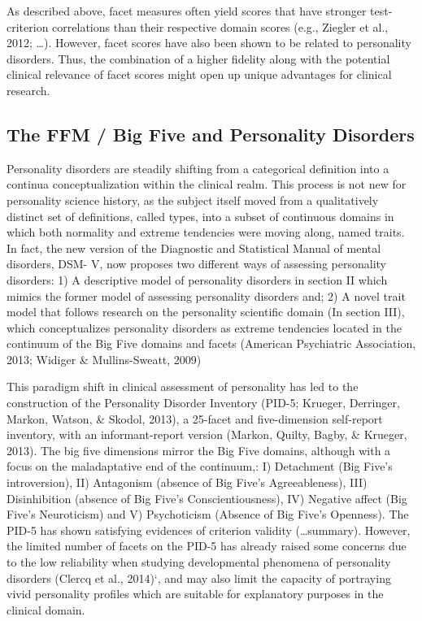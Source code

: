 \documentclass[man]{apa6}
\theoremstyle{definition}
\theoremstyle{definition}
\theoremstyle{definition}
\theoremstyle{remark}
\begin{document}
As described above, facet measures often yield scores that have stronger
test-criterion correlations than their respective domain scores (e.g.,
Ziegler et al., 2012; \ldots{}). However, facet scores have also been
shown to be related to personality disorders. Thus, the combination of a
higher fidelity along with the potential clinical relevance of facet
scores might open up unique advantages for clinical research.

\hypertarget{the-ffm-big-five-and-personality-disorders}{%
\subsection{The FFM / Big Five and Personality
Disorders}\label{the-ffm-big-five-and-personality-disorders}}

Personality disorders are steadily shifting from a categorical
definition into a continua conceptualization within the clinical realm.
This process is not new for personality science history, as the subject
itself moved from a qualitatively distinct set of definitions, called
types, into a subset of continuous domains in which both normality and
extreme tendencies were moving along, named traits. In fact, the new
version of the Diagnostic and Statistical Manual of mental disorders,
DSM- V, now proposes two different ways of assessing personality
disorders: 1) A descriptive model of personality disorders in section II
which mimics the former model of assessing personality disorders and; 2)
A novel trait model that follows research on the personality scientific
domain (In section III), which conceptualizes personality disorders as
extreme tendencies located in the continuum of the Big Five domains and
facets (American Psychiatric Association, 2013; Widiger \&
Mullins-Sweatt, 2009)

This paradigm shift in clinical assessment of personality has led to the
construction of the Personality Disorder Inventory (PID-5; Krueger,
Derringer, Markon, Watson, \& Skodol, 2013), a 25-facet and
five-dimension self-report inventory, with an informant-report version
(Markon, Quilty, Bagby, \& Krueger, 2013). The big five dimensions
mirror the Big Five domains, although with a focus on the maladaptative
end of the continuum,: I) Detachment (Big Five's introversion), II)
Antagonism (absence of Big Five's Agreeableness), III) Disinhibition
(absence of Big Five's Conscientiousness), IV) Negative affect (Big
Five's Neuroticism) and V) Psychoticism (Absence of Big Five's
Openness). The PID-5 has shown satisfying evidences of criterion
validity (\ldots{}summary). However, the limited number of facets on the
PID-5 has already raised some concerns due to the low reliability when
studying developmental phenomena of personality disorders (Clercq et
al., 2014)`, and may also limit the capacity of portraying vivid
personality profiles which are suitable for explanatory purposes in the
clinical domain.
\end{document}
